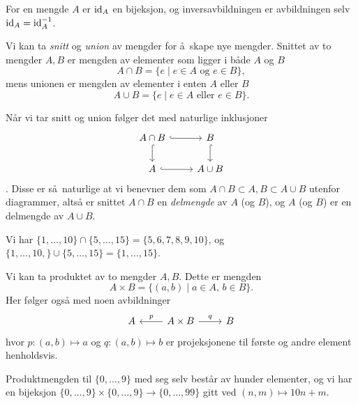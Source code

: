 \begin{example}
    For en mengde $A$ er $\operatorname{id}_A$ en bijeksjon,
    og inversavbildningen er avbildningen selv $\operatorname{id}_A = \operatorname{id}_A^{-1}$.
\end{example}

\begin{example}
    Vi kan ta \textit{snitt} og \textit{union} av mengder for å skape nye mengder.
    Snittet av to mengder $A,B$ er mengden av elementer som ligger i både $A$ og $B$
    \[
        A\cap B = \{ e\mid e\in A\mbox{ og } e\in B\},
    \]
    mens unionen er mengden av elementer i enten $A$ eller $B$
    \[
        A\cup B = \{ e\mid e\in A\mbox{ eller } e\in B\}.
    \]

    Når vi tar snitt og union følger det med naturlige inklusjoner
    \[\begin{tikzcd}
        A\cap B
        \rar[hook]
        \dar[hook]
        & B
        \dar[hook]
        \\
        A
        \rar[hook]
        &
        A\cup B
    \end{tikzcd}\].
    Disse er så naturlige at vi benevner dem som $A\cap B\subset A,B\subset A\cup B$
    utenfor diagrammer, altså er snittet $A\cap B$
    en \textit{delmengde} av $A$ (og $B$),
    og $A$ (og $B$) er en delmengde av $A\cup B$.
\end{example}

\begin{example}
    Vi har $\{1,\dots,10\}\cap \{5,\dots,15\} = \{5, 6, 7, 8, 9, 10\}$,
    og $\{1,\dots, 10,\}\cup \{5,\dots, 15\} = \{1,\dots, 15\}$.
\end{example}

\begin{example}
    Vi kan ta produktet av to mengder $A, B$.
    Dette er mengden
    \[
        A\times B = \{
            (a,b)\mid a\in A,\, b\in B
        \}.
    \]
    Her følger også med noen avbildninger
    \[\begin{tikzcd}
        A
        \rar[<-]{p}
        &
        A\times B
        \rar{q}
        &
        B
    \end{tikzcd}\]
    hvor $p\colon (a,b)\mapsto a$ og $q\colon (a,b)\mapsto b$ er
    projeksjonene til første og andre element henholdsvis.
\end{example}

\begin{example}
    Produktmengden til $\{0,\dots,9\}$ med seg selv består av hunder elementer,
    og vi har en bijeksjon $\{0,\dots,9\}\times\{0,\dots,9\}\to \{0,\dots,99\}$
    gitt ved $(n, m)\mapsto 10n + m$.
\end{example}


